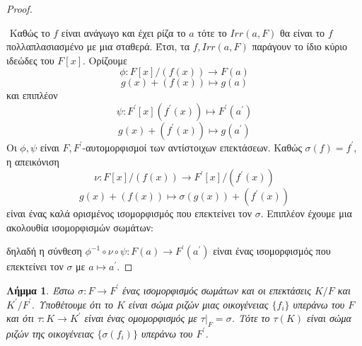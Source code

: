 \documentclass[oneside,a4paper]{article}
\newtheorem{lemma}{Λήμμα}
\begin{document}
\begin{proof} $ $

	$ $\newline
	Καθώς το $f$ είναι ανάγωγο και έχει ρίζα το $a$ τότε το $Irr(a,F)$ θα είναι το $f$ πολλαπλασιασμένο με μια σταθερά. Έτσι, τα $f , Irr(a,F)$ παράγουν το ίδιο κύριο ιδεώδες του $F[x]$. Ορίζουμε
	$$\phi : F[x]/(f(x)) \longrightarrow F(a)$$
	$$g(x) + (f(x)) \longmapsto g(a)$$
	και επιπλέον
	$$\psi : F^{\prime} [x] (f^{\prime}(x)) \longmapsto F^{\prime}(a^{\prime})$$
	$$g(x) + (f^{\prime}(x)) \longmapsto g(a^{\prime})$$
	Οι $\phi, \psi$ είναι $F,F^{\prime}$-αυτομορφισμοί των αντίστοιχων επεκτάσεων. Καθώς $\sigma (f) = f^{\prime}$, η απεικόνιση 
	$$\nu : F[x]/(f(x)) \longrightarrow F^{\prime}[x]/(f^{\prime}(x))$$
	$$g(x) + (f(x)) \longmapsto \sigma(g(x)) + (f^{\prime}(x))$$
	είναι ένας καλά ορισμένος ισομορφισμός που επεκτείνει τον $\sigma$. Επιπλέον έχουμε μια ακολουθία ισομορφισμών σωμάτων:
	\begin{center}
	\end{center}
	δηλαδή η σύνθεση $\phi^{-1} \circ \nu \circ \psi : F(a) \rightarrow F^{\prime}(a^{\prime})$ είναι ένας ισομορφισμός που επεκτείνει τον $\sigma$ με $a \mapsto a^{\prime}$.
\end{proof}
\vspace{0.1cm}
\begin{lemma} Έστω $\sigma : F \rightarrow F^{\prime}$ ένας ισομορφισμός σωμάτων και οι επεκτάσεις $K/F$ και $K^{\prime} / F^{\prime}$. Υποθέτουμε ότι το $K$ είναι σώμα ριζών μιας οικογένειας $\{f_i\}$ υπεράνω του $F$ και ότι $\tau : K \rightarrow K^{\prime}$ είναι ένας ομομορφισμός με $\tau|_F = \sigma$. Τότε το $\tau(K)$ είναι σώμα ριζών της οικογένειας $\{\sigma(f_i) \}$ υπεράνω του $F^{\prime}$.
\label{3.18}
\end{lemma}
\end{document}
